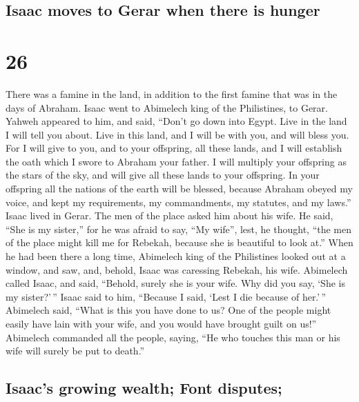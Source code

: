 \hypertarget{isaac-moves-to-gerar-when-there-is-hunger}{%
\subsection{Isaac moves to Gerar when there is
hunger}\label{isaac-moves-to-gerar-when-there-is-hunger}}

\hypertarget{section-25}{%
\section{26}\label{section-25}}

 There was a famine in the land, in addition to the first
famine that was in the days of Abraham. Isaac went to Abimelech king of
the Philistines, to Gerar.  Yahweh appeared to him, and
said, ``Don't go down into Egypt. Live in the land I will tell you
about.  Live in this land, and I will be with you, and
will bless you. For I will give to you, and to your offspring, all these
lands, and I will establish the oath which I swore to Abraham your
father.  I will multiply your offspring as the stars of
the sky, and will give all these lands to your offspring. In your
offspring all the nations of the earth will be blessed, 
because Abraham obeyed my voice, and kept my requirements, my
commandments, my statutes, and my laws.''  Isaac lived in
Gerar.  The men of the place asked him about his wife. He
said, ``She is my sister,'' for he was afraid to say, ``My wife'', lest,
he thought, ``the men of the place might kill me for Rebekah, because
she is beautiful to look at.''  When he had been there a
long time, Abimelech king of the Philistines looked out at a window, and
saw, and, behold, Isaac was caressing Rebekah, his wife. 
Abimelech called Isaac, and said, ``Behold, surely she is your wife. Why
did you say, `She is my sister?'\,'' Isaac said to him, ``Because I
said, `Lest I die because of her.'\,''  Abimelech said,
``What is this you have done to us? One of the people might easily have
lain with your wife, and you would have brought guilt on us!''
 Abimelech commanded all the people, saying, ``He who
touches this man or his wife will surely be put to death.''

\hypertarget{isaacs-growing-wealth-font-disputes}{%
\subsection{Isaac's growing wealth; Font
disputes;}\label{isaacs-growing-wealth-font-disputes}}

